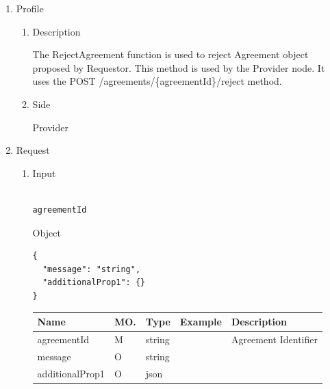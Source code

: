 \begin{enumerate}

\item Profile

\begin{enumerate}

\item Description

The RejectAgreement function is used to reject Agreement object proposed by Requestor. This method is used by the Provider node. 
It uses the POST /agreements/\{agreementId\}/reject method.

\item Side

Provider

\end{enumerate}

\item Request

\begin{enumerate}

\item Input

\begin{tcolorbox}[boxrule=0pt, frame empty]
\begin{verbatim}

agreementId

\end{verbatim}
\end{tcolorbox}

Object
\begin{tcolorbox}[boxrule=0pt, frame empty]
\begin{verbatim}
{
  "message": "string",
  "additionalProp1": {}
}
\end{verbatim}
\end{tcolorbox}

\begin{center}
\begin{tabular}{|p{3cm}|l|p{3cm}|p{3cm}|p{4cm}|} 
\hline
\rowcolor{lightgray}	Name	& MO.	& Type	& Example & 	Description \\
\hline

agreementId		& M & 	string				&		& 	Agreement Identifier \\
\hline

message 		& O	& 	string				&		&	 	\\ 
\hline

additionalProp1 & O	& 	json				&		&	 	\\ 
\hline

\end{tabular}
\end{center}


\end{enumerate}
\end{enumerate}
